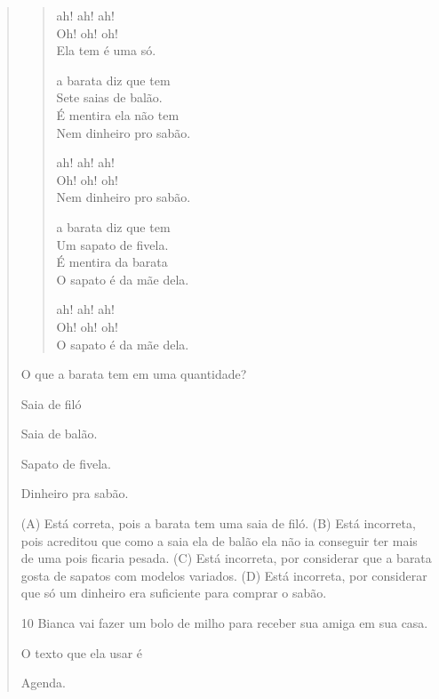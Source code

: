 \begin{verse}
\begin{verse}
ah! ah! ah!\\
Oh! oh! oh!\\
Ela tem é uma só.

a barata diz que tem\\
Sete saias de balão.\\
É mentira ela não tem\\
Nem dinheiro pro sabão.

ah! ah! ah!\\
Oh! oh! oh!\\
Nem dinheiro pro sabão.

a barata diz que tem\\
Um sapato de fivela.\\
É mentira da barata\\
O sapato é da mãe dela.

ah! ah! ah!\\
Oh! oh! oh!\\
O sapato é da mãe dela.
\end{verse}


O que a barata tem em uma quantidade?

\begin{escolha}
\item Saia de filó

\item Saia de balão.

\item Sapato de fivela.

\item Dinheiro pra sabão.
\end{escolha}


(A) Está correta, pois a barata tem uma saia de filó.
(B) Está incorreta, pois acreditou que como a saia ela de balão ela não
ia conseguir ter mais de uma pois ficaria pesada.
(C) Está incorreta, por considerar que a barata gosta de sapatos com
modelos variados.
(D) Está incorreta, por considerar que só um dinheiro era suficiente
para comprar o sabão.

\num{10} Bianca vai fazer um bolo de milho para receber sua amiga em sua casa.

O texto que ela usar é

\begin{minipage}{.5\textwidth}
\begin{escolha}
\item Agenda.


\end{escolha}
\end{minipage}
\end{verse}
